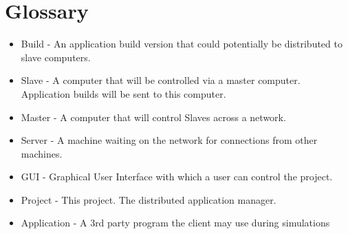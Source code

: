 \documentclass[a4paper,12pt,final]{article}
\begin{document}
\newpage
\section{Glossary}
\begin{itemize}
\item{Build - An application build version that could potentially be distributed to slave computers.}
\item{Slave - A computer that will be controlled via a master computer. Application builds will be sent to this computer.}
\item{Master - A computer that will control Slaves across a network.}
\item{Server - A machine waiting on the network for connections from other machines.}
\item{GUI - Graphical User Interface with which a user can control the project.}
\item{Project - This project. The distributed application manager.}
\item{Application - A 3rd party program the client may use during simulations}
\end{itemize}
\end{document}
